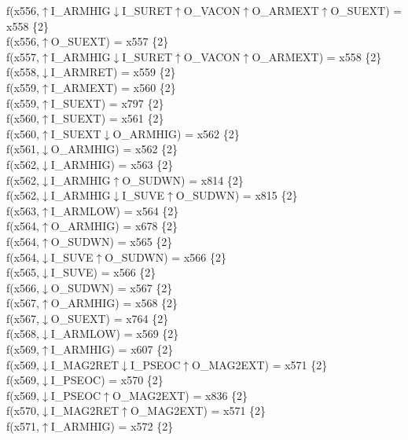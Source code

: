 f(x556,$\uparrow$I\_ARMHIG$\downarrow$I\_SURET$\uparrow$O\_VACON$\uparrow$O\_ARMEXT$\uparrow$O\_SUEXT) = x558 \{2\} \\  
f(x556,$\uparrow$O\_SUEXT) = x557 \{2\} \\  
f(x557,$\uparrow$I\_ARMHIG$\downarrow$I\_SURET$\uparrow$O\_VACON$\uparrow$O\_ARMEXT) = x558 \{2\} \\  
f(x558,$\downarrow$I\_ARMRET) = x559 \{2\} \\  
f(x559,$\uparrow$I\_ARMEXT) = x560 \{2\} \\  
f(x559,$\uparrow$I\_SUEXT) = x797 \{2\} \\  
f(x560,$\uparrow$I\_SUEXT) = x561 \{2\} \\  
f(x560,$\uparrow$I\_SUEXT$\downarrow$O\_ARMHIG) = x562 \{2\} \\  
f(x561,$\downarrow$O\_ARMHIG) = x562 \{2\} \\  
f(x562,$\downarrow$I\_ARMHIG) = x563 \{2\} \\  
f(x562,$\downarrow$I\_ARMHIG$\uparrow$O\_SUDWN) = x814 \{2\} \\  
f(x562,$\downarrow$I\_ARMHIG$\downarrow$I\_SUVE$\uparrow$O\_SUDWN) = x815 \{2\} \\  
f(x563,$\uparrow$I\_ARMLOW) = x564 \{2\} \\  
f(x564,$\uparrow$O\_ARMHIG) = x678 \{2\} \\  
f(x564,$\uparrow$O\_SUDWN) = x565 \{2\} \\  
f(x564,$\downarrow$I\_SUVE$\uparrow$O\_SUDWN) = x566 \{2\} \\  
f(x565,$\downarrow$I\_SUVE) = x566 \{2\} \\  
f(x566,$\downarrow$O\_SUDWN) = x567 \{2\} \\  
f(x567,$\uparrow$O\_ARMHIG) = x568 \{2\} \\  
f(x567,$\downarrow$O\_SUEXT) = x764 \{2\} \\  
f(x568,$\downarrow$I\_ARMLOW) = x569 \{2\} \\  
f(x569,$\uparrow$I\_ARMHIG) = x607 \{2\} \\  
f(x569,$\downarrow$I\_MAG2RET$\downarrow$I\_PSEOC$\uparrow$O\_MAG2EXT) = x571 \{2\} \\  
f(x569,$\downarrow$I\_PSEOC) = x570 \{2\} \\  
f(x569,$\downarrow$I\_PSEOC$\uparrow$O\_MAG2EXT) = x836 \{2\} \\  
f(x570,$\downarrow$I\_MAG2RET$\uparrow$O\_MAG2EXT) = x571 \{2\} \\  
f(x571,$\uparrow$I\_ARMHIG) = x572 \{2\} \\  
